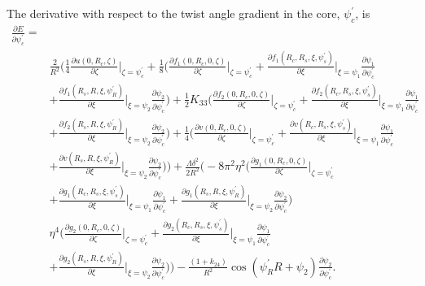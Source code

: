 \documentclass[12pt]{article}
\begin{document}
The derivative with respect to the twist angle gradient in the core, $\psi_c^{\prime}$, is
\begin{align}
\frac{\partial E}{\partial \psi_c^{\prime}}=&\nonumber\\
&\frac{2}{R^2}\bigg(\frac{1}{4}\frac{\partial u(0,R_c,\zeta)}{\partial\zeta}\bigg|_{\zeta=\psi_c^{\prime}}+\frac{1}{8}\bigg(\frac{\partial f_1(0,R_c,0,\zeta)}{\partial\zeta}\bigg|_{\zeta=\psi_c^{\prime}}+\frac{\partial f_1(R_c,R_s,\xi,\psi_s^{\prime})}{\partial \xi}\bigg|_{\xi=\psi_1}\frac{\partial\psi_1}{\partial\psi_c^{\prime}}\nonumber\\
&+\frac{\partial f_1(R_s,R,\xi,\psi_R^{\prime})}{\partial\xi}\bigg|_{\xi=\psi_2}\frac{\partial\psi_2}{\partial\psi_c^{\prime}}\bigg)+\frac{1}{2}K_{33}\bigg(\frac{\partial f_2(0,R_c,0,\zeta)}{\partial\zeta}\bigg|_{\zeta=\psi_c^{\prime}}+\frac{\partial f_2(R_c,R_s,\xi,\psi_s^{\prime})}{\partial\xi}\bigg|_{\xi=\psi_1}\frac{\partial\psi_1}{\partial\psi_c^{\prime}}\nonumber\\
&+\frac{\partial f_2(R_s,R,\xi,\psi_R^{\prime})}{\partial\xi}\bigg|_{\xi=\psi_2}\frac{\partial\psi_2}{\partial\psi_c^{\prime}}\bigg)+\frac{1}{4}\bigg(\frac{\partial v(0,R_c,0,\zeta)}{\partial\zeta}\bigg|_{\zeta=\psi_c^{\prime}}+\frac{\partial v(R_c,R_s,\xi,\psi_s^{\prime})}{\partial\xi}\bigg|_{\xi=\psi_1}\frac{\partial\psi_1}{\partial\psi_c^{\prime}}\nonumber\\
&+\frac{\partial v(R_s,R,\xi,\psi_R^{\prime})}{\partial\xi}\bigg|_{\xi=\psi_2}\frac{\partial\psi_2}{\partial\psi_c^{\prime}}\bigg)\bigg)+\frac{\Lambda\delta^2}{2R^2}\bigg(-8\pi^2\eta^2\bigg(\frac{\partial g_1(0,R_c,0,\zeta)}{\partial\zeta}\bigg|_{\zeta=\psi_c^{\prime}}\nonumber\\
&+\frac{\partial g_1(R_c,R_s,\xi,\psi_s^{\prime})}{\partial\xi}\bigg|_{\xi=\psi_1}\frac{\partial\psi_1}{\partial\psi_c^{\prime}}+\frac{\partial g_1(R_s,R,\xi,\psi_R^{\prime})}{\partial\xi}\bigg|_{\xi=\psi_2}\frac{\partial \psi_2}{\partial\psi_c^{\prime}}\bigg)\nonumber\\
&\eta^4\bigg(\frac{\partial g_2(0,R_c,0,\zeta)}{\partial\zeta}\bigg|_{\zeta=\psi_c^{\prime}}+\frac{\partial g_2(R_c,R_s,\xi,\psi_s^{\prime})}{\partial\xi}\bigg|_{\xi=\psi_1}\frac{\partial\psi_1}{\partial\psi_c^{\prime}}\nonumber\\
&+\frac{\partial g_2(R_s,R,\xi,\psi_R^{\prime})}{\partial\xi}\bigg|_{\xi=\psi_2}\frac{\partial\psi_2}{\partial\psi_c^{\prime}}\bigg)\bigg)-\frac{(1+k_{24})}{R^2}\cos(\psi_R^{\prime}R+\psi_2)\frac{\partial\psi_2}{\partial\psi_c^{\prime}}.\label{eq:dEdpsi_cp}
\end{align}
\end{document}
